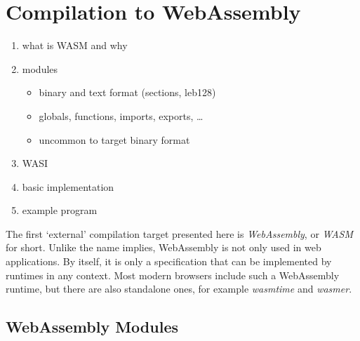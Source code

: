 \section{Compilation to WebAssembly}\label{sec:wasm}

\begin{enumerate}
	\item what is WASM and why
	\item modules
	      \begin{itemize}
		      \item binary and text format (sections, leb128)
		      \item globals, functions, imports, exports, \ldots
		      \item uncommon to target binary format
	      \end{itemize}
	\item WASI
	\item basic implementation
	\item example program
\end{enumerate}

The first `external' compilation target presented here is \emph{WebAssembly}, or \emph{WASM} for short.
Unlike the name implies, WebAssembly is not only used in web applications.
By itself, it is only a specification that can be implemented by runtimes in any context.
Most modern browsers include such a WebAssembly runtime, but there are also standalone ones, for example \emph{wasmtime} and \emph{wasmer}.

\subsection{WebAssembly Modules}

